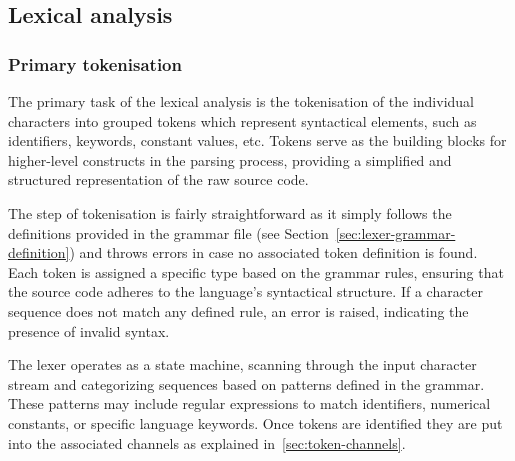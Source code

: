 \subsection{Lexical analysis}

\subsubsection{Primary tokenisation}

The primary task of the lexical analysis is the tokenisation of the individual characters into grouped tokens which represent syntactical elements, such as identifiers, keywords, constant values, etc. Tokens serve as the building blocks for higher-level constructs in the parsing process, providing a simplified and structured representation of the raw source code.

The step of tokenisation is fairly straightforward as it simply follows the definitions provided in the grammar file (see Section~\ref{sec:lexer-grammar-definition}) and throws errors in case no associated token definition is found. Each token is assigned a specific type based on the grammar rules, ensuring that the source code adheres to the language's syntactical structure. If a character sequence does not match any defined rule, an error is raised, indicating the presence of invalid syntax.

The lexer operates as a state machine, scanning through the input character stream and categorizing sequences based on patterns defined in the grammar. These patterns may include regular expressions to match identifiers, numerical constants, or specific language keywords. Once tokens are identified they are put into the associated channels as explained in~\ref{sec:token-channels}.

